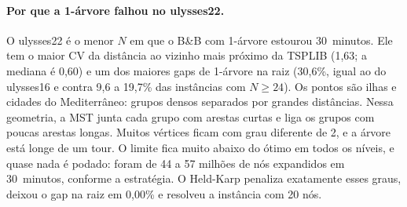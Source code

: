 \paragraph{Por que a 1-árvore falhou no ulysses22.} O ulysses22 é o menor
$N$ em que o B\&B com 1-árvore estourou 30~minutos. Ele tem o maior CV da
distância ao vizinho mais próximo da TSPLIB (1,63; a mediana é 0,60) e um
dos maiores gaps de 1-árvore na raiz (30,6\%, igual ao do ulysses16 e
contra 9,6 a 19,7\% das instâncias com $N\ge24$). Os pontos são ilhas e
cidades do Mediterrâneo: grupos densos separados por grandes distâncias.
Nessa geometria, a MST junta cada grupo com arestas curtas e liga os grupos
com poucas arestas longas. Muitos vértices ficam com grau diferente de 2, e
a árvore está longe de um tour. O limite fica muito abaixo do ótimo em
todos os níveis, e quase nada é podado: foram de 44 a 57 milhões de nós
expandidos em 30~minutos, conforme a estratégia. O Held-Karp penaliza exatamente esses graus, deixou o gap na
raiz em 0,00\% e resolveu a instância com 20 nós.
